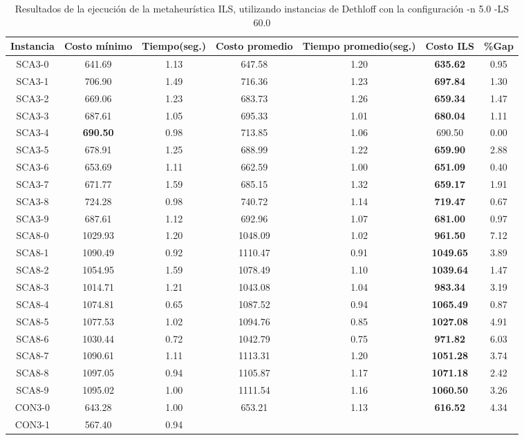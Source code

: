 \begin{table}[ht]
\caption{Resultados de la ejecución de la metaheurística ILS, utilizando instancias de Dethloff con la configuración -n 5.0 -LS 60.0}
\centering
\small
\begin{tabular}{c c c c c c c}
\hline\hline
Instancia & Costo mínimo & Tiempo(seg.) & Costo promedio & Tiempo promedio(seg.) & Costo ILS & \%Gap \\ [0.5ex]
\hline
SCA3-0 & 641.69 & 1.13 & 
647.58 & 1.20 & \bf{635.62} & 
0.95\\SCA3-1 & 706.90 & 1.49 & 
716.36 & 1.23 & \bf{697.84} & 
1.30\\SCA3-2 & 669.06 & 1.23 & 
683.73 & 1.26 & \bf{659.34} & 
1.47\\SCA3-3 & 687.61 & 1.05 & 
695.33 & 1.01 & \bf{680.04} & 
1.11\\SCA3-4 & \bf{690.50} & 0.98 & 
713.85 & 1.06 & 690.50 & 0.00\\
SCA3-5 & 678.91 & 1.25 & 
688.99 & 1.22 & \bf{659.90} & 
2.88\\SCA3-6 & 653.69 & 1.11 & 
662.59 & 1.00 & \bf{651.09} & 
0.40\\SCA3-7 & 671.77 & 1.59 & 
685.15 & 1.32 & \bf{659.17} & 
1.91\\SCA3-8 & 724.28 & 0.98 & 
740.72 & 1.14 & \bf{719.47} & 
0.67\\SCA3-9 & 687.61 & 1.12 & 
692.96 & 1.07 & \bf{681.00} & 
0.97\\SCA8-0 & 1029.93 & 1.20 & 
1048.09 & 1.02 & \bf{961.50} & 
7.12\\SCA8-1 & 1090.49 & 0.92 & 
1110.47 & 0.91 & \bf{1049.65} & 
3.89\\SCA8-2 & 1054.95 & 1.59 & 
1078.49 & 1.10 & \bf{1039.64} & 
1.47\\SCA8-3 & 1014.71 & 1.21 & 
1043.08 & 1.04 & \bf{983.34} & 
3.19\\SCA8-4 & 1074.81 & 0.65 & 
1087.52 & 0.94 & \bf{1065.49} & 
0.87\\SCA8-5 & 1077.53 & 1.02 & 
1094.76 & 0.85 & \bf{1027.08} & 
4.91\\SCA8-6 & 1030.44 & 0.72 & 
1042.79 & 0.75 & \bf{971.82} & 
6.03\\SCA8-7 & 1090.61 & 1.11 & 
1113.31 & 1.20 & \bf{1051.28} & 
3.74\\SCA8-8 & 1097.05 & 0.94 & 
1105.87 & 1.17 & \bf{1071.18} & 
2.42\\SCA8-9 & 1095.02 & 1.00 & 
1111.54 & 1.16 & \bf{1060.50} & 
3.26\\CON3-0 & 643.28 & 1.00 & 
653.21 & 1.13 & \bf{616.52} & 
4.34\\CON3-1 & 567.40 & 0.94 & 

\end{tabular}
\end{table}
